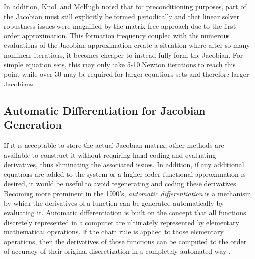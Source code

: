 In addition, Knoll and McHugh noted that for preconditioning purposes,
part of the Jacobian must still explicitly be formed periodically and
that linear solver robustness issues were magnified by the matrix-free
approach due to the first-order approximation. This formation
frequency coupled with the numerous evaluations of the Jacobian
approximation create a situation where after so many nonlinear
iterations, it becomes cheaper to instead fully form the Jacobian. For
simple equation sets, this may only take 5-10 Newton iterations to
reach this point while over 30 may be required for larger equations
sets and therefore larger Jacobians.

\subsection{Automatic Differentiation for Jacobian Generation}
\label{subsec:automatic_differentiation}
If it is acceptable to store the actual Jacobian matrix, other methods
are available to construct it without requiring hand-coding and
evaluating derivatives, thus eliminating the associated issues. In
addition, if any additional equations are added to the system or a
higher order functional approximation is desired, it would be useful
to avoid regenerating and coding these derivatives. Becoming more
prominent in the 1990's, \textit{automatic differentiation} is a
mechanism by which the derivatives of a function can be generated
automatically by evaluating it. Automatic differentiation is built on
the concept that all functions discretely represented in a computer
are ultimately represented by elementary mathematical operations. If
the chain rule is applied to those elementary operations, then the
derivatives of those functions can be computed to the order of
accuracy of their original discretization in a completely automated
way \cite{averick_computing_1994}.


